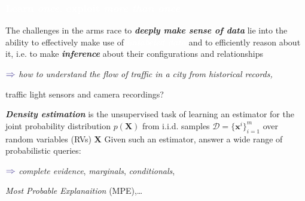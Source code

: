 \documentclass[xcolor={usenames,dvipsnames,svgnames}, compress]{beamer}
\newcommand{\highlighttext}[2][yellow]{{\colorbox{#1}{\textcolor{white}{#2}}}}
\begin{document}
\begin{frame}[t]
  \frametitle{\highlighttext[tomato4]{Learn \emph{once}, exploit \emph{more than once}}}
  \footnotesize
  
   The challenges in the arms race to \emph{\textbf{deeply
       make sense of data}}
   lie into the  ability to effectively make use of \highlighttext[tomato0]{\emph{\textbf{unlabeled data}}}
   and to efficiently reason about it, i.e. to make
   \emph{\textbf{inference}} about their configurations and
   relationships\par
   \hfill\begin{minipage}{1.0\linewidth}
    \vspace{5pt}
    \raggedleft
    $\color{violet}\boldsymbol\Rightarrow$
    \scriptsize
    \it
    how to understand the flow of traffic in a city from historical
    records,\par
    traffic light sensors and camera recordings?
  \end{minipage}\par\bigskip

   \emph{\textbf{Density estimation}} is the unsupervised task of
    learning an estimator for the joint probability distribution
    $p(\mathbf{X})$ from i.i.d. samples $\mathcal{D}=\{\mathbf
    x^i\}_{i=1}^m$ over random variables (RVs) $\mathbf{X}$
    Given such an estimator, answer a wide range of probabilistic
    queries:\par
    \hfill\begin{minipage}{0.75\linewidth}
    \vspace{5pt}
    \raggedleft
    $\color{violet}\boldsymbol\Rightarrow$
    \scriptsize
    \emph{complete evidence}, \emph{marginals}, \emph{conditionals},\par
    \emph{Most Probable Explanaition} (MPE),\dots %
  \end{minipage}\par\bigskip





\end{frame}
\end{document}
